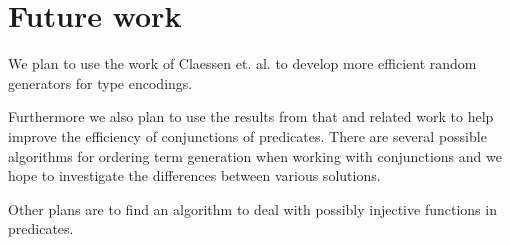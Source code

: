 \section{Future work}
We plan to use the work of Claessen et. al. \cite{Claessen2014generating}
to develop more efficient random
generators for type encodings.

Furthermore we also plan to use the
results from that and related work to
help improve the efficiency
of conjunctions of predicates.
There are several possible algorithms for
ordering term generation when working with
conjunctions and we hope to investigate the
differences between various solutions.

Other plans are to find an algorithm to deal
with possibly injective functions in predicates.
